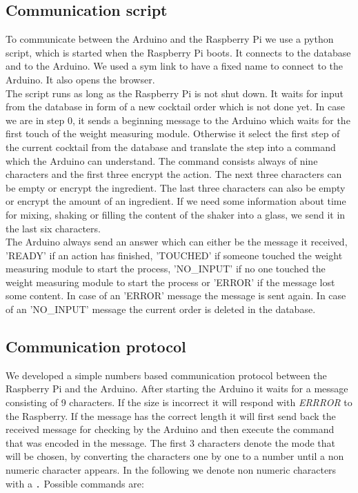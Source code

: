 \documentclass{acm_proc_article-sp}
\begin{document}
\subsection{Communication script}
To communicate between the Arduino and the Raspberry Pi we use a python script, which is started when the Raspberry Pi boots. It connects to the database and to the Arduino. We used a sym link to have a fixed name to connect to the Arduino. It also opens the browser. \\
The script runs as long as the Raspberry Pi is not shut down. It waits for input from the database in form of a new cocktail order which is not done yet. In case we are in step 0, it sends a beginning message to the Arduino which waits for the first touch of the weight measuring module. Otherwise it select the first step of the current cocktail from the database and translate the step into a command which the Arduino can understand. The command consists always of nine characters and the first three encrypt the action. The next three characters can be empty or encrypt the ingredient. The last three characters can also be empty or encrypt the amount of an ingredient. If we need some information about time for mixing, shaking or filling the content of the shaker into a glass, we send it in the last six characters. \\
The Arduino always send an answer which can either be the message it received, 'READY' if an action has finished, 'TOUCHED' if someone touched the weight measuring module to start the process, 'NO\_INPUT' if no one touched the weight measuring module to start the process or 'ERROR' if the message lost some content. In case of an 'ERROR' message the message is sent again. In case of an 'NO\_INPUT' message the current order is deleted in the database.

\subsection{Communication protocol}
We developed a simple numbers based communication protocol between the Raspberry Pi and the Arduino. After starting the Arduino it waits for a message consisting of 9 characters. If the size is incorrect it will respond with \textit{ERRROR} to the Raspberry. If the message has the correct length it will first send back the received message for checking by the Arduino and then execute the command that was encoded in the message. The first 3 characters denote the mode that will be chosen, by converting the characters one by one to a number until a non numeric character appears. In the following we denote non numeric characters with a \texttt{.} Possible commands are:
\end{document}
